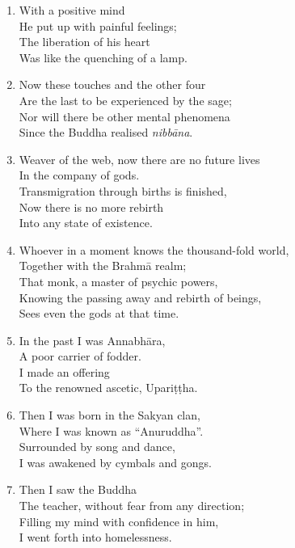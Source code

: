 \documentclass[10pt, openany]{book}
\begin{document}
\begin{enumerate}
\item With a positive mind\\
He put up with painful feelings;\\
The liberation of his heart\\
Was like the quenching of a lamp.

\item Now these touches and the other four\\
Are the last to be experienced by the sage;\\
Nor will there be other mental phenomena\\
Since the Buddha realised \emph{nibbāna}.

\item Weaver of the web, now there are no future lives\\
In the company of gods.\\
Transmigration through births is finished,\\
Now there is no more rebirth \\
Into any state of existence.

\item Whoever in a moment knows the thousand-fold world,\\
Together with the Brahmā realm;\\
That monk, a master of psychic powers,\\
Knowing the passing away and rebirth of beings,\\
Sees even the gods at that time.

\item In the past I was Annabhāra,\\
A poor carrier of fodder.\\
I made an offering\\
To the renowned ascetic, Upariṭṭha.

\item Then I was born in the Sakyan clan,\\
Where I was known as “Anuruddha”.\\
Surrounded by song and dance,\\
I was awakened by cymbals and gongs.

\item Then I saw the Buddha\\
The teacher, without fear from any direction;\\
Filling my mind with confidence in him,\\
I went forth into homelessness.


\end{enumerate}
\end{document}
